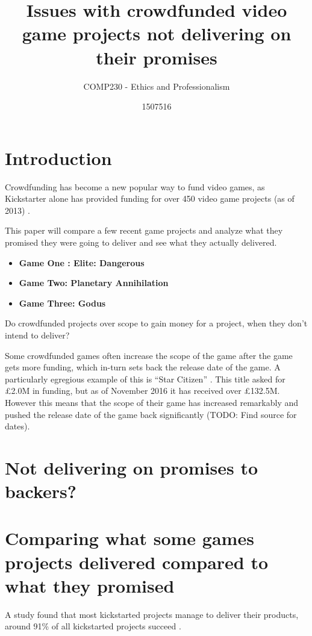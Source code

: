 \documentclass{scrartcl}
\title{Issues with crowdfunded video game projects not delivering on their promises} %
\subtitle{COMP230 - Ethics and Professionalism}
\author{1507516}
\begin{document}
\maketitle


\section{Introduction}
Crowdfunding has become a new popular way to fund video games\cite{xu2014show}, as Kickstarter alone has provided funding for over 450 video game projects (as of 2013) \cite{Harris:2013}. %

This paper will compare a few recent game projects and analyze what they promised they were going to deliver and see what they actually delivered.
\begin{itemize}

\item  \textbf{Game One : Elite: Dangerous}
\item  \textbf{Game Two: Planetary Annihilation}
\item  \textbf{Game Three: Godus}
\end{itemize}

Do crowdfunded projects over scope to gain money for a project, when they don't intend to deliver?


Some crowdfunded games often increase the scope of the game after the game gets more funding, which in-turn sets back the release date of the game. A particularly egregious example of this is ``Star Citizen'' \cite{kickstarterStarCitizen}. This title asked for £2.0M in funding, but as of November 2016 it has received over £132.5M. However this means that the scope of their game has increased remarkably and pushed the release date of the game back significantly (TODO: Find source for dates).

\section{Not delivering on promises to backers?}

\section{Comparing what some games projects delivered compared to what they promised}
A study found that most kickstarted projects manage to deliver their products, around 91\% of all kickstarted projects succeed \cite{mollick2015}.
\end{document}
